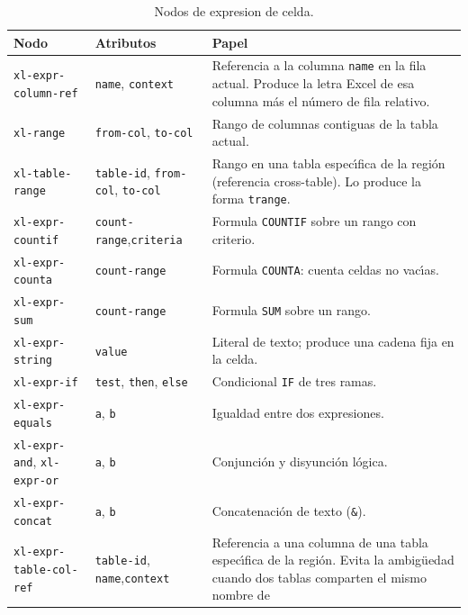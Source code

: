 \documentclass[12pt,a4paper]{report}
\begin{document}
\begin{table}[h!]
\centering
\caption{Nodos de expresion de celda.}
\label{tab:ast-expresiones}
\renewcommand{\arraystretch}{1.3}
\begin{tabular}{p{4.2cm} p{3.8cm} p{5.8cm}}
\hline
\textbf{Nodo} & \textbf{Atributos} & \textbf{Papel} \\
\hline
\texttt{xl-expr-column-ref}
  & \texttt{name}, \texttt{context}
  & Referencia a la columna \texttt{name} en la fila actual.
    Produce la letra Excel de esa columna m\'as el n\'umero
    de fila relativo. \\
\hline
\texttt{xl-range}
  & \texttt{from-col}, \texttt{to-col}
  & Rango de columnas contiguas de la tabla actual. \\
\hline
\texttt{xl-table-range}
  & \texttt{table-id},\newline
    \texttt{from-col}, \texttt{to-col}
  & Rango en una tabla espec\'{\i}fica de la regi\'on
    (referencia cross-table).  Lo produce la forma
    \texttt{trange}. \\
\hline
\texttt{xl-expr-countif}
  & \texttt{count-range},\newline\texttt{criteria}
  & Formula \texttt{COUNTIF} sobre un rango con criterio. \\
\hline
\texttt{xl-expr-counta}
  & \texttt{count-range}
  & Formula \texttt{COUNTA}: cuenta celdas no vac\'{\i}as. \\
\hline
\texttt{xl-expr-sum}
  & \texttt{count-range}
  & Formula \texttt{SUM} sobre un rango. \\
\hline
\texttt{xl-expr-string}
  & \texttt{value}
  & Literal de texto; produce una cadena fija en la celda. \\
\hline
\texttt{xl-expr-if}
  & \texttt{test}, \texttt{then}, \texttt{else}
  & Condicional \texttt{IF} de tres ramas. \\
\hline
\texttt{xl-expr-equals}
  & \texttt{a}, \texttt{b}
  & Igualdad entre dos expresiones. \\
\hline
\texttt{xl-expr-and}, \texttt{xl-expr-or}
  & \texttt{a}, \texttt{b}
  & Conjunci\'on y disyunci\'on l\'ogica. \\
\hline
\texttt{xl-expr-concat}
  & \texttt{a}, \texttt{b}
  & Concatenaci\'on de texto (\texttt{\&}). \\
\hline
\texttt{xl-expr-table-col-ref}
  & \texttt{table-id}, \texttt{name},\newline\texttt{context}
  & Referencia a una columna de una tabla espec\'{\i}fica de la regi\'on.
    Evita la ambig\"uedad cuando dos tablas comparten el mismo nombre de

\end{tabular}
\end{table}
\end{document}
